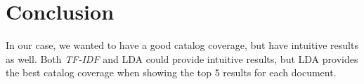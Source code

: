 \chapter{Conclusion} \label{chp:chapter4}

In our case, we wanted to have a good catalog coverage, but have intuitive results as well. Both \emph{TF-IDF} and LDA could provide intuitive results, but LDA provides the best catalog coverage when showing the top 5 results for each document.
